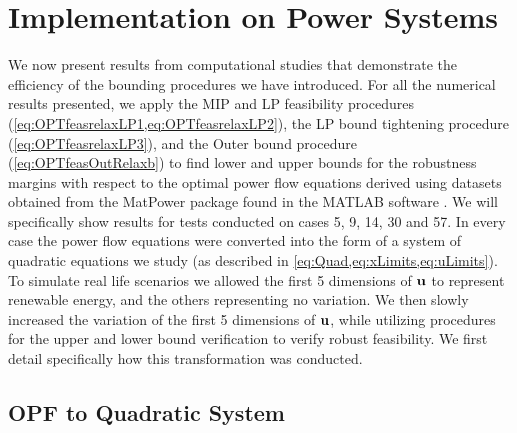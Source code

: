 \section{Implementation on Power Systems} \label{sec:numstd}  

We now present results from computational studies that demonstrate the efficiency of the bounding procedures we have introduced.
For all the numerical results presented, we apply the MIP and LP feasibility procedures (\cref{eq:OPTfeasrelaxLP1,eq:OPTfeasrelaxLP2}), the LP bound tightening procedure (\cref{eq:OPTfeasrelaxLP3}), and the Outer bound procedure (\cref{eq:OPTfeasOutRelaxb}) to find lower and upper bounds for the robustness margins with respect to the optimal power flow equations derived using datasets obtained from the MatPower package found in the MATLAB software \cite{matpower}. 
We will specifically show results for tests conducted on cases 5, 9, 14, 30 and 57. 
In every case the power flow equations were converted into the form of a system of quadratic equations we study (as described in \cref{eq:Quad,eq:xLimits,eq:uLimits}). 
To simulate real life scenarios we allowed the first 5 dimensions of $\mathbf{u}$ to represent renewable energy, and the others representing no variation. We then slowly increased the variation of the first 5 dimensions of $\mathbf{u}$, while utilizing procedures for the upper and lower bound verification to verify robust feasibility. 
We first detail specifically how this transformation was conducted.

\subsection{OPF to Quadratic System} \label{ssec:opf2qsys}

